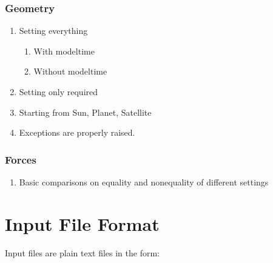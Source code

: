 \documentclass[letterpaper,10pt,english]{sphinxmanual}
\begin{document}
\subsubsection{Geometry}
\label{\detokenize{nexoclom2/TestCases:geometry}}\begin{enumerate}
%
\item {} 
\sphinxAtStartPar
Setting everything
\begin{enumerate}
%
\item {} 
\sphinxAtStartPar
With modeltime

\item {} 
\sphinxAtStartPar
Without modeltime

\end{enumerate}

\item {} 
\sphinxAtStartPar
Setting only required

\item {} 
\sphinxAtStartPar
Starting from Sun, Planet, Satellite

\item {} 
\sphinxAtStartPar
Exceptions are properly raised.

\end{enumerate}


\subsubsection{Forces}
\label{\detokenize{nexoclom2/TestCases:forces}}\begin{enumerate}
%
\item {} 
\sphinxAtStartPar
Basic comparisons on equality and non\sphinxhyphen{}equality of different settings

\end{enumerate}

\sphinxstepscope


\section{Input File Format}
\label{\detokenize{nexoclom2/inputfiles:input-file-format}}\label{\detokenize{nexoclom2/inputfiles:inputfiles}}\label{\detokenize{nexoclom2/inputfiles::doc}}
\sphinxAtStartPar
Input files are plain text files in the form:

\begin{sphinxVerbatim}[commandchars=\\\{\}]
  
\end{sphinxVerbatim}
\end{document}
